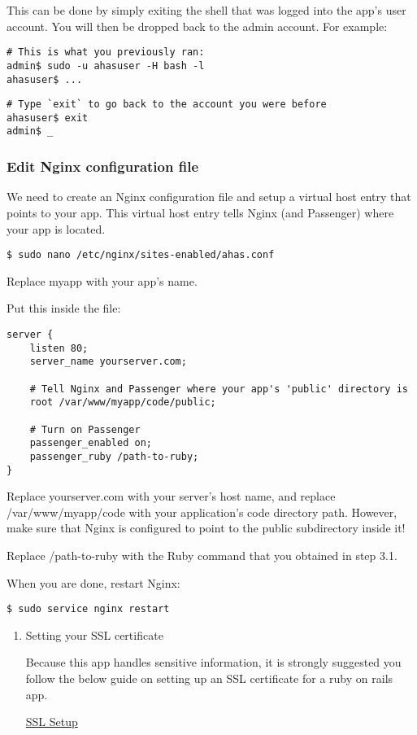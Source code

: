 \documentclass[11pt]{article}
\begin{document}
This can be done by simply exiting the shell that was logged into the app's user account. You will then be dropped back to the admin account. For example:

\begin{verbatim}
# This is what you previously ran:
admin$ sudo -u ahasuser -H bash -l
ahasuser$ ...
\end{verbatim}

\begin{verbatim}
# Type `exit` to go back to the account you were before
ahasuser$ exit
admin$ _
\end{verbatim}

\subsubsection{Edit Nginx configuration file}
\label{sec:org523855f}

We need to create an Nginx configuration file and setup a virtual host entry that points to your app. This virtual host entry tells Nginx (and Passenger) where your app is located.
\begin{verbatim}
$ sudo nano /etc/nginx/sites-enabled/ahas.conf
\end{verbatim}
Replace myapp with your app's name.

Put this inside the file:
\begin{verbatim}
server {
    listen 80;
    server_name yourserver.com;

    # Tell Nginx and Passenger where your app's 'public' directory is
    root /var/www/myapp/code/public;

    # Turn on Passenger
    passenger_enabled on;
    passenger_ruby /path-to-ruby;
}
\end{verbatim}
Replace yourserver.com with your server's host name, and replace /var/www/myapp/code with your application's code directory path. However, make sure that Nginx is configured to point to the public subdirectory inside it!

Replace /path-to-ruby with the Ruby command that you obtained in step 3.1.

When you are done, restart Nginx:

\begin{verbatim}
$ sudo service nginx restart
\end{verbatim}

\begin{enumerate}
\item Setting your SSL certificate
\label{sec:org57e3e92}

Because this app handles sensitive information, it is strongly suggested you follow the below guide on setting up an SSL certificate for a ruby on rails app.

\href{https://www.pluralsight.com/guides/ruby-ruby-on-rails/using-https-with-ruby-on-rails}{SSL Setup}
\end{enumerate}
\end{document}
